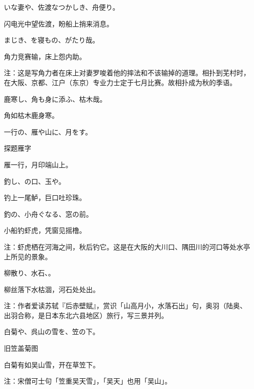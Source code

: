 \begin{haiku}
    {\FH いな妻や、佐渡なつかしき、舟便り。}

    {\FK 闪电光中望佐渡，盼船上捎来消息。}
\end{haiku}

\begin{haiku}
    {\FH {}まじき、を寝もの、がたり哉。}

    {\FK 角力竞赛输，床上怨内助。}

    {\FT 注：这是写角力者在床上对妻罗唆着他的摔法和不该输掉的道理。相扑到芜村时，在大阪、京都、江户（东京）专业力士定于七月比赛。故相扑成为秋的季语。}
\end{haiku}

\begin{haiku}
    {\FH 鹿寒し、角も身に添ふ、枯木哉。}

    {\FK 角如枯木鹿身寒。}
\end{haiku}

\begin{haiku}
    {\FH 一行の、雁や山に、月をす。}

    {\FK 探题雁字}

    {\FK 雁一行，月印端山上。}
\end{haiku}

\begin{haiku}
    {\FH 釣し、の口、玉や。}

    {\FK 钓上一尾鲈，巨口吐珍珠。}
\end{haiku}

\begin{haiku}
    {\FH {}釣の、小舟ぐなる、窓の前。}

    {\FK 小船钓虾虎，凭窗见摇橹。}

    {\FT 注：虾虎栖在河海之间，秋后钓它。这是在大阪的大川口、隅田川的河口等处水亭上所见的景象。}
\end{haiku}

\begin{haiku}
    {\FH 柳散り、水石、。}

    {\FK 柳丝落下水枯涸，河石处处出。}

    {\FT 注：作者爱读苏轼『后赤壁赋』，赏识「山高月小，水落石出」句，奥羽（陆奥、出羽合称，是日本东北六县地区）旅行，写三景并列。}
\end{haiku}

\begin{haiku}
    {\FH 白菊や、呉山の雪を、笠の下。}

    {\FK 旧笠盖菊图}

    {\FK 白菊有如吴山雪，开在草笠下。}

    {\FT 注：宋僧可士句「笠重吴天雪」，「吴天」也用「吴山」。}
\end{haiku}

